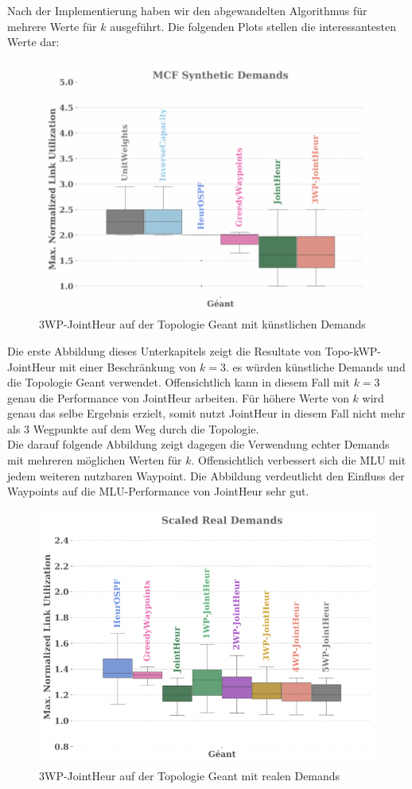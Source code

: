 \documentclass[sigconf,noacm,review]{acmart}
\begin{document}
Nach der Implementierung haben wir den abgewandelten Algorithmus für mehrere Werte für $k$ ausgeführt. Die folgenden Plots stellen die interessantesten Werte dar:
\begin{figure}[h]
  \centering
  \includegraphics[width=\linewidth]{abbildungen/syntDemtopokwp}
  \caption{3WP-JointHeur auf der Topologie Geant mit künstlichen Demands}
\end{figure}
Die erste Abbildung dieses Unterkapitels zeigt die Resultate von Topo-kWP-JointHeur mit einer Beschränkung von $k = 3$. es würden künstliche Demands und die Topologie Geant verwendet.
Offensichtlich kann in diesem Fall mit $k = 3$ genau die Performance von JointHeur arbeiten. Für höhere Werte von $k$ wird genau das selbe Ergebnis erzielt, somit 
nutzt JointHeur in diesem Fall nicht mehr als 3 Wegpunkte auf dem Weg durch die Topologie. \\
Die darauf folgende Abbildung zeigt dagegen die Verwendung echter Demands mit mehreren möglichen Werten für $k$. Offensichtlich verbessert sich die MLU mit jedem weiteren nutzbaren Waypoint. 
Die Abbildung verdeutlicht den Einfluss der Waypoints auf die MLU-Performance von JointHeur sehr gut. 
\begin{figure}[h]
  \centering
  \includegraphics[width=\linewidth]{abbildungen/realDemtopokwp}
  \caption{3WP-JointHeur auf der Topologie Geant mit realen Demands}
\end{figure}
\end{document}
